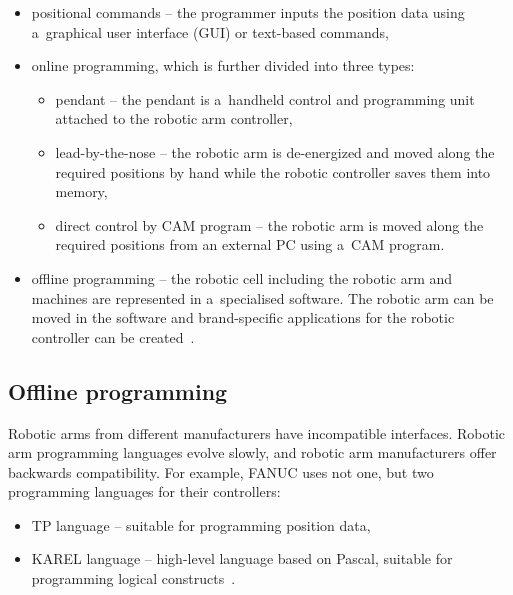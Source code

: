 \begin{itemize}
    \item positional commands -- the programmer inputs the position data using a~graphical user interface (GUI) or text-based commands,
    
    \item online programming, which is further divided into three types:
    
    \begin{itemize}
    
    \item pendant -- the pendant is a~handheld control and programming unit attached to the robotic arm controller,
    \item lead-by-the-nose -- the robotic arm is de-energized and moved along the required positions by hand while the robotic controller saves them into memory,
    \item direct control by CAM program -- the robotic arm is moved along the required positions from an external PC using a~CAM program.
    
    \end{itemize}
    
    \item offline programming -- the robotic cell including the robotic arm and machines are represented in a~specialised software. The robotic arm can be moved in the software and brand-specific applications for the robotic controller can be created~\cite{robodkmethods}.
  

\end{itemize}

\subsection{Offline programming}
Robotic arms from different manufacturers have incompatible interfaces. Robotic arm programming languages evolve slowly, and robotic arm manufacturers offer backwards compatibility. For example, FANUC uses not one, but two programming languages for their controllers: 

\begin{itemize}

 \item TP language -- suitable for programming position data,
 \item KAREL language -- high-level language based on Pascal, suitable for programming logical constructs~\cite{fanuchandling}.

\end{itemize}


